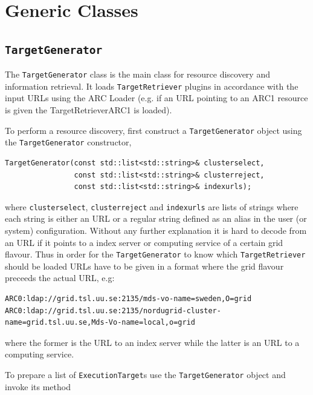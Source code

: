 \documentclass{book}
\newcommand{\TargetGenerator}{\texttt{TargetGenerator}}
\newcommand{\TargetRetriever}{\texttt{TargetRetriever}}
\newcommand{\ExecutionTarget}{\texttt{ExecutionTarget}}
\begin{document}
\section{Generic Classes}
\subsection{{\TargetGenerator}} The {\TargetGenerator} class is the main class for resource discovery and information retrieval. It loads 
{\TargetRetriever} plugins in accordance with the input URLs using the ARC Loader (e.g. if an URL pointing to an ARC1 resource is given 
the TargetRetrieverARC1 is loaded).

To perform a resource discovery, first construct a {\TargetGenerator} object using the {\TargetGenerator} constructor,

\begin{shaded}
\begin{verbatim}
TargetGenerator(const std::list<std::string>& clusterselect,
                const std::list<std::string>& clusterreject,
                const std::list<std::string>& indexurls);
\end{verbatim}
\end{shaded}

where \texttt{clusterselect}, \texttt{clusterreject} and \texttt{indexurls} are lists of strings where each string is either 
an URL or a regular string defined as an alias in the user (or system) configuration. Without any further explanation it is 
hard to decode from an URL if it points to a index server or computing service of a certain grid flavour. Thus in order for 
the {\TargetGenerator} to know which {\TargetRetriever} should be loaded URLs have to be given in a format where the grid 
flavour preceeds the actual URL, e.g:

\begin{shaded}
\begin{small}
\begin{verbatim}
ARC0:ldap://grid.tsl.uu.se:2135/mds-vo-name=sweden,O=grid
ARC0:ldap://grid.tsl.uu.se:2135/nordugrid-cluster-name=grid.tsl.uu.se,Mds-Vo-name=local,o=grid
\end{verbatim}
\end{small}
\end{shaded}

where the former is the URL to an index server while the latter is an URL to a computing service.

To prepare a list of {\ExecutionTarget}s use the {\TargetGenerator} object and invoke its method
\end{document}
